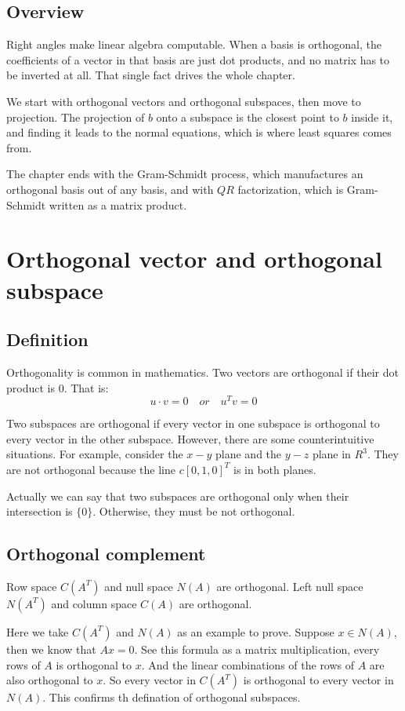 \documentclass[10pt,a4paper,oneside,numbers=noenddot]{scrbook}
\theoremstyle{ctplain}
\theoremstyle{ctresult}
\begin{document}
\subsection*{Overview}

Right angles make linear algebra computable. When a basis is orthogonal, the coefficients
of a vector in that basis are just dot products, and no matrix has to be inverted at all.
That single fact drives the whole chapter.

We start with orthogonal vectors and orthogonal subspaces, then move to projection. The
projection of $b$ onto a subspace is the closest point to $b$ inside it, and finding it
leads to the normal equations, which is where least squares comes from.

The chapter ends with the Gram-Schmidt process, which manufactures an orthogonal basis out
of any basis, and with $QR$ factorization, which is Gram-Schmidt written as a matrix
product.


\section{Orthogonal vector and orthogonal subspace}
\subsection{Definition}

Orthogonality is common in mathematics. Two vectors are orthogonal if their dot product
is 0. That is:
\[
  u \cdot v = 0 \quad or \quad u^{T}v = 0
\]

Two subspaces are orthogonal if every vector in one subspace is orthogonal to every
vector in the other subspace. However, there are some counterintuitive situations.
For example, consider the $x-y$ plane and the $y-z$ plane in $R^{3}$. They are not
orthogonal because the line $c[0, 1, 0]^T$ is in both planes.


Actually we can say that two subspaces are orthogonal only when their intersection is
$\{0\}$. Otherwise, they must be not orthogonal. 

\subsection{Orthogonal complement}

Row space $C(A^{T})$ and null space $N(A)$ are orthogonal. Left null space $N(A^{T})$
and column space $C(A)$ are orthogonal.

Here we take $C(A^{T})$ and $N(A)$ as an example to prove. Suppose $x \in N(A)$, then
we know that $Ax = 0$. See this formula as a matrix multiplication, every rows of $A$
is orthogonal to $x$. And the linear combinations of the rows of $A$ are also orthogonal to
$x$. So every vector in $C(A^{T})$ is orthogonal to every vector in $N(A)$. This confirms
th defination of orthogonal subspaces.
\end{document}
